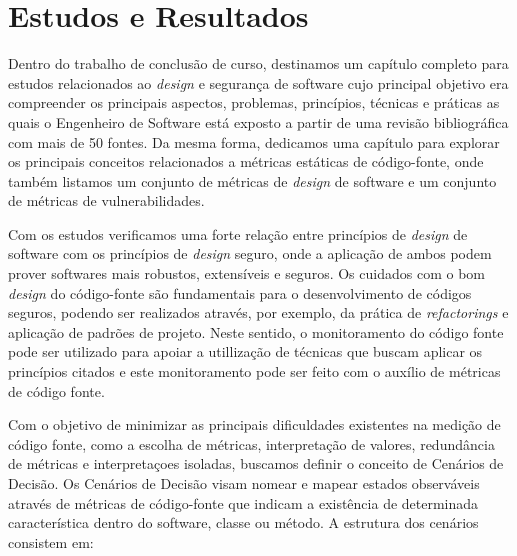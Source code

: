 \section{Estudos e Resultados}
\label{sec:studies}

Dentro do trabalho de conclusão de curso, destinamos um capítulo completo para estudos relacionados ao \emph{design} e segurança de software cujo principal objetivo era compreender os principais aspectos, problemas, princípios, técnicas e práticas as quais o Engenheiro de Software está exposto a partir de uma revisão bibliográfica com mais de 50 fontes. Da mesma forma, dedicamos uma capítulo para explorar os principais conceitos relacionados a métricas estáticas de código-fonte, onde também listamos um conjunto de métricas de \emph{design} de software e um conjunto de métricas de vulnerabilidades.


Com os estudos verificamos uma forte relação entre princípios de \emph{design} de software com os princípios de \emph{design} seguro, onde a aplicação de ambos podem prover softwares mais robustos, extensíveis e seguros. Os cuidados com o bom \emph{design} do código-fonte são fundamentais para o desenvolvimento de códigos seguros, podendo ser realizados através, por exemplo, da prática de \emph{refactorings} e aplicação de padrões de projeto. Neste sentido, o monitoramento do código fonte pode ser utilizado para apoiar a utillização de técnicas que buscam aplicar os princípios citados e este monitoramento pode ser feito com o auxílio de métricas de código fonte.

Com o objetivo de minimizar as principais dificuldades existentes na medição de código fonte, como a escolha de métricas, interpretação de valores, redundância de métricas e interpretaçoes isoladas, buscamos definir o conceito de Cenários de Decisão. Os Cenários de Decisão  visam nomear e mapear estados observáveis através de métricas de código-fonte que indicam a existência de determinada característica dentro do software, classe ou método. A estrutura dos cenários consistem em:

